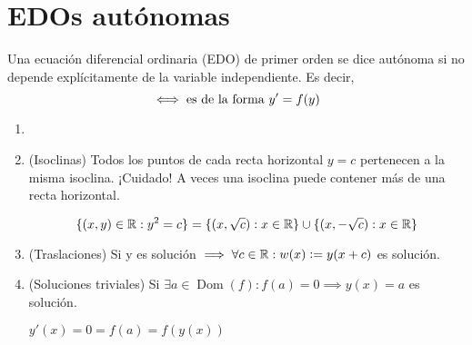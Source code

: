 \section{EDOs autónomas}

\begin{defn}
	Una ecuación diferencial ordinaria (EDO) de primer orden se dice autónoma si no depende explícitamente de la variable independiente. Es decir, 
	\[\iff \text{es de la forma } y'=f(y)\]
\end{defn}

\begin{prop}
	\begin{enumerate}
		\item[]
		\item (Isoclinas) Todos los puntos de cada recta horizontal $y=c$ pertenecen a la misma isoclina. ¡Cuidado! A veces una isoclina puede contener más de una recta horizontal.
		\begin{ejem}[$y'=y^2$]
			\[\{(x,y)\in \mathbb{R}:y^2=c\}=\{(x,\sqrt{c}):x\in\mathbb{R}\}\cup\{(x,-\sqrt{c}):x\in\mathbb{R}\}\]
		\end{ejem}
		\item (Traslaciones) Si y es solución $\implies \forall c \in \mathbb{R} : w(x)\vcentcolon= y(x+c)$ es solución.
		\item (Soluciones triviales) Si $\exists a \in \operatorname{Dom}(f) : f(a)=0 \implies y(x)=a$ es solución.
		\begin{dem}
			$y'(x)=0=f(a)=f(y(x))$
		\end{dem}
	\end{enumerate}
\end{prop}

